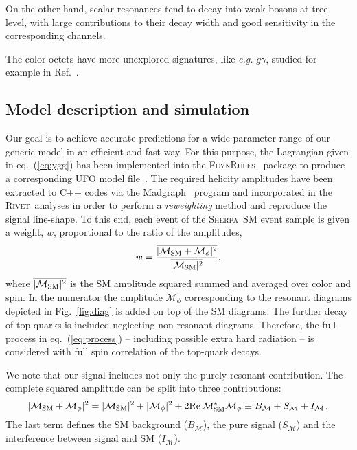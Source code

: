 \documentclass[aps,prd,amsmath,amssymb,superscriptaddress, preprintnumbers,preprint,nofootinbib,a4paper]{revtex4}
\def\Sherpa{\textsc{Sherpa}}
\def\Rivet{\textsc{Rivet}}
\def\Feynrules{\textsc{FeynRules}}
\def\eq#1{{eq.~(\ref{#1})}}
\begin{document}
On the other hand, scalar resonances tend to decay into weak bosons at tree level, with
large contributions to their decay width and good sensitivity in the corresponding channels. 

The color octets have more unexplored signatures, like \emph{e.g.} $g\gamma$, studied for example in Ref.~\cite{Aad:2015ywd,Aaboud:2017nak}.




\subsection{Model description and simulation}

Our goal is to achieve accurate predictions for a wide parameter range of our generic model in an efficient and fast way. 
For this purpose, the Lagrangian given in \eq{eq:ygg} has been implemented into the \Feynrules~\cite{Alloul:2013bka} package to produce
a corresponding UFO model file~\cite{Degrande:2011ua}. 
The required helicity amplitudes have been extracted to C++ codes via the Madgraph~\cite{Alwall:2011uj} program and incorporated in the \Rivet\,   analyses in order to perform a \emph{reweighting} method and reproduce the signal line-shape.
To this end, each event of the \Sherpa\ SM event sample is given a weight, $w$, proportional to the ratio of the amplitudes,
\begin{equation}
w=\frac{\overline{|\mathcal{M}_{\rm SM}+\mathcal{M}_\phi|^2}}{\overline{|\mathcal{M}_{\rm SM}|^2}},
\end{equation}
where $\overline{|\mathcal{M}_{\rm SM}|^2}$ is the SM amplitude  squared summed and averaged over color and spin. In the numerator the amplitude $\mathcal{M}_\phi$ corresponding to the resonant diagrams depicted in Fig.~\ref{fig:diag} is added on top of the SM diagrams. The further decay of top quarks is included neglecting non-resonant diagrams. Therefore, the full  process in \eq{eq:process} -- including possible extra hard radiation -- is considered with full spin correlation of the top-quark decays. 

We note that our signal includes not only the purely resonant contribution. The complete squared amplitude can be split into three contributions:
\begin{equation}
|\mathcal{M}_{\rm SM}+\mathcal{M}_\phi|^2= 
|\mathcal{M}_{\rm SM}|^2+|\mathcal{M}_{\phi}|^2
+2{\rm Re}\, \mathcal{M}_{\rm SM}^*\mathcal{M}_{\phi}
\equiv B_\mathcal{M}+S_\mathcal{M}+I_\mathcal{M}\,.
\end{equation}
The last term defines the SM background ($B_\mathcal{M}$), the pure signal ($S_\mathcal{M}$) and the interference between signal and SM ($I_\mathcal{M}$). 
\end{document}
